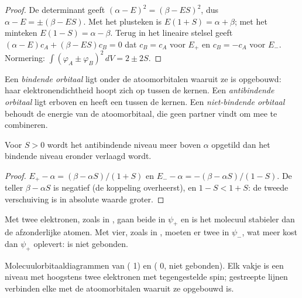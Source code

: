 \begin{proof}
De determinant geeft $(\alpha - E)^2 = (\beta - ES)^2$, dus $\alpha - E = \pm(\beta - ES)$.
Met het plusteken is $E(1 + S) = \alpha + \beta$; met het minteken $E(1 - S) = \alpha
- \beta$. Terug in het lineaire stelsel geeft $(\alpha - E)c_A + (\beta - ES)c_B = 0$ dat $c_B
= c_A$ voor $E_+$ en $c_B = -c_A$ voor $E_-$. Normering: $\int(\varphi_A \pm
\varphi_B)^2\,dV = 2 \pm 2S$.
\end{proof}

\begin{definition}\label{def:b2:diatomic-mos:bonding}
Een \emph{bindende orbitaal} ligt onder de atoomorbitalen waaruit ze
is opgebouwd: haar elektronendichtheid hoopt zich op tussen de kernen. Een
\emph{antibindende orbitaal} ligt erboven en heeft een
 tussen de kernen. Een \emph{niet-bindende orbitaal}
behoudt de energie van de atoomorbitaal, die geen partner vindt om
mee te combineren.
\end{definition}

\begin{proposition}\label{prop:b2:diatomic-mos:asymmetry}
Voor $S > 0$ wordt het antibindende niveau meer boven $\alpha$ opgetild dan het
bindende niveau eronder verlaagd wordt.
\end{proposition}

\begin{proof}
$E_+ - \alpha = (\beta - \alpha S)/(1 + S)$ en $E_- - \alpha = -(\beta - \alpha S)/(1 - S)$.
De teller $\beta - \alpha S$ is negatief (de koppeling overheerst), en $1 - S < 1
+ S$: de tweede verschuiving is in absolute waarde groter.
\end{proof}

Met twee elektronen, zoals in , gaan beide in $\psi_+$ en is het molecuul stabieler
dan de afzonderlijke atomen. Met vier, zoals in , moeten er twee in $\psi_-$,
wat meer kost dan $\psi_+$ oplevert:  is niet gebonden.

\begin{omfigure}
\begin{MOdiagram}
\end{MOdiagram}
\hspace{1.5cm}
\begin{MOdiagram}
\end{MOdiagram}

{\small Molecuulorbitaaldiagrammen van  ( 1) en  (
0, niet gebonden). Elk vakje is een niveau met hoogstens twee elektronen met
tegengestelde spin; gestreepte lijnen verbinden elke  met de atoomorbitalen
waaruit ze opgebouwd is.}
\end{omfigure}

